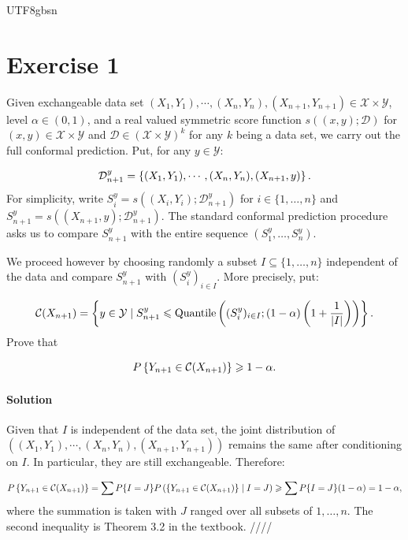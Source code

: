 \documentclass[../../main.tex]{subfiles}
\begin{document}
\begin{CJK*}{UTF8}{gbsn}

\section*{Exercise 1}

Given exchangeable data set $(X_1, Y_1), \cdots, (X_{n}, Y_{n}), (X_{n+1}, Y_{n+1})
\in \mathcal{X} \times \mathcal{Y}$,
level $\alpha \in (0,1)$,
and a real valued symmetric score function $s((x,y); \mathcal{D})$
for $(x,y) \in \mathcal{X} \times \mathcal{Y}$
and $\mathcal{D} \in (\mathcal{X} \times \mathcal{Y})^k$
for any $k$ being a data set,
we carry out the full conformal prediction.
Put, for any $y \in \mathcal{Y}$:

\begin{equation*}
    \mathcal{D}_{n+1}^y = \left \{ (X_1, Y_1), \cdots, (X_{n}, Y_{n}), (X_{n+1}, y) \right \}.
\end{equation*}
For simplicity, write $S_i^y = s((X_i, Y_i); \mathcal{D}_{n+1}^y)$
for $i \in \{1, \ldots, n\}$
and $S_{n+1}^y = s((X_{n+1}, y); \mathcal{D}_{n+1}^y)$.
The standard conformal prediction procedure 
asks us to compare $S_{n+1}^y$
with the entire sequence $(S_{1}^y, \ldots, S_n^y)$.

We proceed however by choosing randomly 
a subset $I \subseteq \{1, \ldots, n\}$ 
independent of the data 
and compare $S_{n+1}^y$ with $(S_i^y)_{i \in I}$.
More precisely, put:

\begin{equation*}
    \mathcal{C}(X_{n+1})
    =\left \{ y \in \mathcal{Y} \mid S_{n+1}^{y} \leqslant
    \text{Quantile} \left ( (S_i^{y})_{i \in I};
    (1-\alpha)\left ( 1+\frac{1}{|I|}  \right )  \right ) \right \}.
\end{equation*}
Prove that 

\begin{equation*}
    P \left \{ Y_{n+1} \in \mathcal{C}(X_{n+1}) \right \} \geqslant 1 - \alpha.
\end{equation*}

\paragraph{Solution}
Given that $I$ is independent of the data set,
the joint distribution of 
$((X_1, Y_1), \cdots, (X_{n}, Y_{n}), (X_{n+1}, Y_{n+1}))$
remains the same after conditioning on $I$.
In particular, they are still exchangeable.
Therefore:

\begin{equation*}
    P \left \{ Y_{n+1} \in \mathcal{C}(X_{n+1}) \right \} = \sum P\{I = J\} P\left ( 
        \left \{ Y_{n+1} \in \mathcal{C}(X_{n+1}) \right \} \mid I = J \right ) \geqslant \sum P\{I = J\} (1 - \alpha) = 1 - \alpha,
\end{equation*}
where the summation is taken with $J$ ranged over all subsets of ${1, \ldots, n}$.
The second inequality is Theorem 3.2 in the textbook.
////

\end{CJK*}
\end{document}
